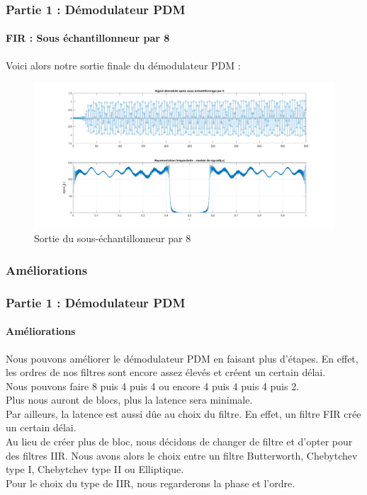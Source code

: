\documentclass[
10pt,
aspectratio=169,
]{beamer}
\begin{document}
\begin{frame}
\frametitle{Partie 1 : Démodulateur PDM} 
\framesubtitle{FIR : Sous échantillonneur par 8} 
Voici alors notre sortie finale du démodulateur PDM : 
\begin{figure}[h]
    \centering
    \includegraphics[scale=0.2]{Images/signal8.png}
    \caption{Sortie du sous-échantillonneur par 8}
    \label{fig:sig8}
\end{figure}
\end{frame}

\subsubsection{Améliorations}
\begin{frame}
\frametitle{Partie 1 : Démodulateur PDM} 
\framesubtitle{Améliorations} 
Nous pouvons améliorer le démodulateur PDM en faisant plus d'étapes. En effet, les ordres de nos filtres sont encore assez élevés et créent un certain délai.\\
Nous pouvons faire {8 puis 4 puis 4} ou encore {4 puis 4 puis 4 puis 2}.\\
Plus nous auront de blocs, plus la latence sera minimale.\\
\vspace{0.5cm}
Par ailleurs, la latence est aussi dûe au choix du filtre. En effet, un filtre FIR crée un certain délai.\\
Au lieu de créer plus de bloc, nous décidons de changer de filtre et d'opter pour des filtres IIR. Nous avons alors le choix entre un filtre Butterworth, Chebytchev type I, Chebytchev type II ou Elliptique.\\
Pour le choix du type de IIR, nous regarderons la phase et l'ordre.
\end{frame}
\end{document}
